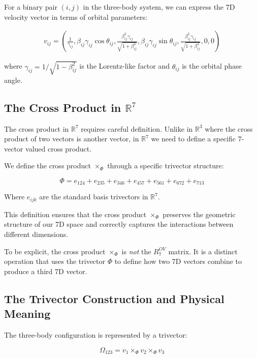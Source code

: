 \documentclass{article}
\begin{document}
For a binary pair $(i,j)$ in the three-body system, we can express the 7D velocity vector in terms of orbital parameters:

\begin{align}
v_{ij} = \left(\frac{1}{\gamma_{ij}}, \beta_{ij}\gamma_{ij}\cos\theta_{ij}, \frac{\beta_{ij}^2\gamma_{ij}}{\sqrt{1+\beta_{ij}^4}}, \beta_{ij}\gamma_{ij}\sin\theta_{ij}, \frac{\beta_{ij}^2\gamma_{ij}}{\sqrt{1+\beta_{ij}^4}}, 0, 0\right)
\end{align}

where $\gamma_{ij} = 1/\sqrt{1-\beta_{ij}^2}$ is the Lorentz-like factor and $\theta_{ij}$ is the orbital phase angle.

\subsection{The Cross Product in $\mathbb{R}^7$}

The cross product in $\mathbb{R}^7$ requires careful definition. Unlike in $\mathbb{R}^3$ where the cross product of two vectors is another vector, in $\mathbb{R}^7$ we need to define a specific $7$-vector valued cross product.

We define the cross product $\times_\Phi$ through a specific trivector structure:

\begin{equation}
\Phi = e_{124} + e_{235} + e_{346} + e_{457} + e_{561} + e_{672} + e_{713}
\end{equation}

Where $e_{ijk}$ are the standard basis trivectors in $\mathbb{R}^7$.

This definition ensures that the cross product $\times_\Phi$ preserves the geometric structure of our 7D space and correctly captures the interactions between different dimensions.

To be explicit, the cross product $\times_\Phi$ is \textit{not} the $R^{OV}_7$ matrix. It is a distinct operation that uses the trivector $\Phi$ to define how two 7D vectors combine to produce a third 7D vector.

\subsection{The Trivector Construction and Physical Meaning}

The three-body configuration is represented by a trivector:

\begin{equation}
\Omega_{123} = v_1 \times_\Phi v_2 \times_\Phi v_3
\end{equation}
\end{document}
